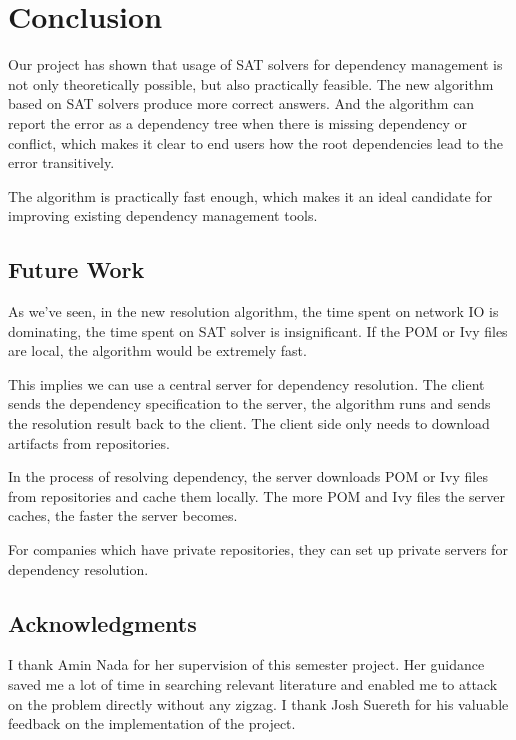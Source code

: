 \section{Conclusion}

Our project has shown that usage of SAT solvers for dependency management is not only theoretically possible, but also practically feasible. The new algorithm based on SAT solvers produce more correct answers. And the algorithm can report the error as a dependency tree when there is missing dependency or conflict, which makes it clear to end users how the root dependencies lead to the error transitively.

The algorithm is practically fast enough, which makes it an ideal candidate for improving existing dependency management tools.

\subsection{Future Work}

As we've seen, in the new resolution algorithm, the time spent on network IO is dominating, the time spent on SAT solver is insignificant. If the POM or Ivy files are local, the algorithm would be extremely fast.

This implies we can use a central server for dependency resolution. The client sends the dependency specification to the server, the algorithm runs and sends the resolution result back to the client. The client side only needs to download artifacts from repositories.

In the process of resolving dependency, the server downloads POM or Ivy files from repositories and cache them locally. The more POM and Ivy files the server caches, the faster the server becomes.

For companies which have private repositories, they can set up private servers for dependency resolution.

\subsection{Acknowledgments}

I thank Amin Nada for her supervision of this semester project. Her guidance saved me a lot of time in searching relevant literature and enabled me to attack on the problem directly without any zigzag. I thank Josh Suereth for his valuable feedback on the implementation of the project.
